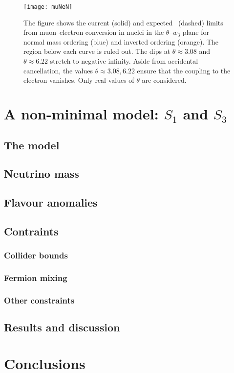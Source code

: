 \begin{figure}[t]
  \centering
  \texttt{[image: muNeN]}
  \caption{The figure shows the current (solid) and
    expected~\cite{Kurup:2011zza} (dashed) limits from muon--electron conversion
    in nuclei in the $\theta$--$w_3$ plane for normal mass ordering (blue) and
    inverted ordering (orange). The region below each curve is ruled out. The
    dips at $\theta \approx 3.08$ and $\theta \approx 6.22$ stretch to negative
    infinity. Aside from accidental cancellation, the values $\theta \approx
    3.08, 6.22$ ensure that the coupling to the electron vanishes. Only real
    values of $\theta$ are considered.}
  \label{fig:ch4-muNeN}
\end{figure}

\section{A non-minimal model: $S_{1}$ and $S_{3}$}
\label{sec:ch4-non-minimal}

\lipsum[1]

\subsection{The model}
\lipsum[1]

\subsection{Neutrino mass}
\lipsum[1]

\subsection{Flavour anomalies}
\lipsum[1]

\subsection{Contraints}
\lipsum[1]

\subsubsection{Collider bounds}
\lipsum[1]

\subsubsection{Fermion mixing}
\lipsum[1]

\subsubsection{Other constraints}
\lipsum[1]

\subsection{Results and discussion}
\lipsum[1]

\section{Conclusions}
\lipsum[1]

